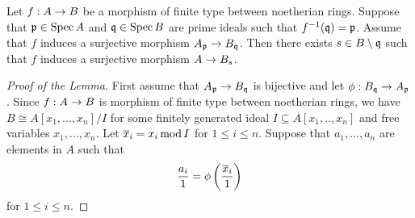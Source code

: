 \begin{lemma}\label{lemma:local_surjections_give_local_closed_immersions}
Let $f:A\rightarrow B$ be a morphism of finite type between noetherian rings. Suppose that $\mathfrak{p}\in \mathrm{Spec}\, A$ and $\mathfrak{q}\in \mathrm{Spec}\, B$ are prime ideals such that $f^{-1}(\mathfrak{q})=\mathfrak{p}$. Assume that $f$ induces a surjective morphism $A_{\mathfrak{p}}\rightarrow B_{\mathfrak{q}}$. Then there exists $s\in B\setminus \mathfrak{q}$ such that $f$ induces a surjective morphism $A\rightarrow B_s$.
\end{lemma}
\begin{proof}[Proof of the Lemma]
First assume that $A_{\mathfrak{p}}\rightarrow B_{\mathfrak{q}}$ is bijective and let $\phi:B_{\mathfrak{q}}\rightarrow A_{\mathfrak{p}}$. Since $f:A\rightarrow B$ is morphism of finite type between noetherian rings, we have $B \cong A[x_1,...,x_n]/I$ for some finitely generated ideal $I\subseteq A[x_1,..,x_n]$ and free variables $x_1,...,x_n$. Let $\overline{x}_i = x_i\,\mathrm{mod}\,I$ for $1\leq i\leq n$. Suppose that $a_1,...,a_n$ are elements in $A$ such that
$$\frac{a_i}{1} = \phi\left(\frac{\overline{x}_i}{1}\right)$$
for $1\leq i\leq n$.
\end{proof}




















































\small







